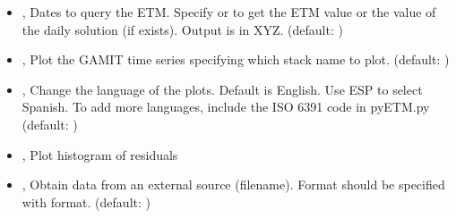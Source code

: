 \documentclass[letterpaper,10pt,english]{sphinxmanual}
\begin{document}
\begin{itemize}
\item {} 
\sphinxAtStartPar
{\hyperref[\detokenize{com:PlotETM.py--q}]{}} , {\hyperref[\detokenize{com:PlotETM.py---query}]{}}  \sphinxhyphen{} Dates to query the ETM. Specify  or  to get the ETM value or the value of the daily solution (if exists). Output is in XYZ. (default: )

\item {} 
\sphinxAtStartPar
{\hyperref[\detokenize{com:PlotETM.py--gamit}]{}} , {\hyperref[\detokenize{com:PlotETM.py---gamit}]{}}  \sphinxhyphen{} Plot the GAMIT time series specifying which stack name to plot. (default: )

\item {} 
\sphinxAtStartPar
{\hyperref[\detokenize{com:PlotETM.py--lang}]{}} , {\hyperref[\detokenize{com:PlotETM.py---language}]{}}  \sphinxhyphen{} Change the language of the plots. Default is English. Use ESP to select Spanish. To add more languages, include the ISO 639\sphinxhyphen{}1 code in pyETM.py (default: )

\item {} 
\sphinxAtStartPar
{\hyperref[\detokenize{com:PlotETM.py--hist}]{}}, {\hyperref[\detokenize{com:PlotETM.py---histogram}]{}} \sphinxhyphen{} Plot histogram of residuals

\item {} 
\sphinxAtStartPar
{\hyperref[\detokenize{com:PlotETM.py--file}]{}} , {\hyperref[\detokenize{com:PlotETM.py---filename}]{}}  \sphinxhyphen{} Obtain data from an external source (filename). Format should be specified with \sphinxhyphen{}format. (default: )


\end{itemize}
\end{document}
